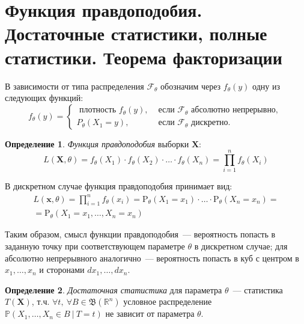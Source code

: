 \documentclass[oneside,final,14pt]{extreport}
\theoremstyle{definition}
\newtheorem{defn}{Определение}[section]
\begin{document}
\section{Функция правдоподобия. Достаточные статистики, полные статистики. Теорема факторизации}

В зависимости от типа распределения $\mathcal{F}_\theta$ обозначим через $f_{\theta}(y)$ одну из следующих функций:
\begin{equation*}
    f_{\theta}(y) =
    \left\{\begin{array}{ll}
    \text { плотность } f_{\theta}(y), & \text { если } \mathcal{F}_{\theta} \text { абсолютно непрерывно, } \\
    P_{\theta}\left(X_{1}=y\right), & \text { если } \mathcal{F}_{\theta} \text { дискретно. }
    \end{array}\right.
\end{equation*}

\begin{defn}
{\it Функция правдоподобия} выборки $\mathbf{X}$:
\begin{equation*}
    L(\mathbf{X} , \theta)=f_{\theta}\left(X_{1}\right) \cdot f_{\theta}\left(X_{2}\right) \cdot \ldots \cdot f_{\theta}\left(X_{n}\right)=\prod_{i=1}^{n} f_{\theta}\left(X_{i}\right)
\end{equation*}
\end{defn}

В дискретном случае функция правдоподобия принимает вид:
\begin{equation*}
\begin{aligned}
    L(\mathbf{x} , \theta)=\prod_{i=1}^{n} f_{\theta}(x_{i}) 
    = \mathrm{P}_{\theta}(X_{1}=x_{1}) \cdot \ldots \cdot \mathrm{P}_{\theta}(X_{n}=x_{n}) = \\
    = \mathrm{P}_{\theta}(X_{1}=x_{1}, \ldots, X_{n}=x_{n})
\end{aligned}
\end{equation*}

Таким образом, смысл функции правдоподобия~--- вероятность попасть в заданную точку при соответствующем параметре $\theta$ в дискретном случае; для абсолютно непрерывного аналогично~--- вероятность попасть в куб с центром в $x_1, \ldots, x_n$ и сторонами $dx_1, \ldots, dx_n$.

\begin{defn}
{\it Достаточная статистика} для параметра $\theta$~--- статистика $T(\mathbf{X})$, т.ч. $\forall t,~ \forall B \in \mathfrak{B}(\mathbb{R}^{n})$ условное распределение $\mathbb{P}(X_1, \ldots, X_n \in B~|~T=t)$ не зависит от параметра $\theta$.
\end{defn}
\end{document}
